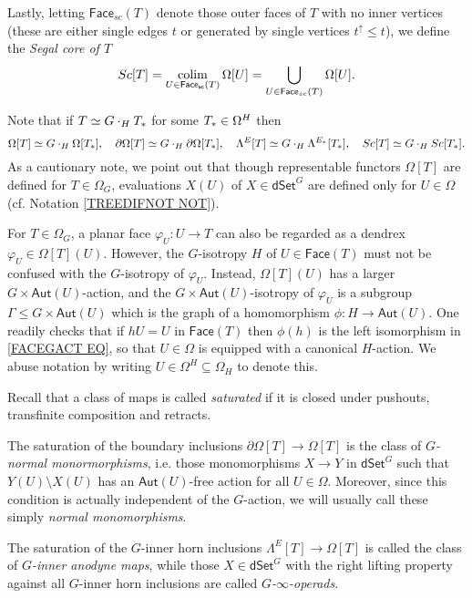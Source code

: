 \documentclass[a4paper,10pt,draft]{article}%
\begin{document}
Lastly, letting $\mathsf{Face}_{sc}(T)$ denote those outer faces of $T$ with no inner vertices (these are either single edges $t$ or generated by single vertices $t^{\uparrow} \leq t$), we define the 
\textit{Segal core of $T$}
\[
	Sc[T] 
= 
	\mathop{\operatorname{colim}}_{U \in 
	\mathsf{Face_{sc}}(T)}
	\Omega[U] 
=
	\bigcup_{U \in 
	\mathsf{Face}_{sc}(T)}
	\Omega[U].
\]

Note that if $T \simeq G \cdot_H T_{\**}$ for some $T_{\**} \in \Omega^H$ then 
\[
	\Omega[T] \simeq G \cdot_H \Omega[T_{\**}], 
\quad
	\partial \Omega[T] \simeq G \cdot_H \partial \Omega[T_{\**}], \quad
	\Lambda^{E}[T] \simeq G \cdot_H \Lambda^{E_{\**}}[T_{\**}],
\quad
	Sc[T] \simeq G \cdot_H Sc[T_{\**}].
\]
As a cautionary note, we point out that though representable functors $\Omega[T]$ are defined for $T \in \Omega_G$,
evaluations $X(U)$ of $X \in \mathsf{dSet}^G$
are defined only for $U \in \Omega$ (cf. Notation \ref{TREEDIFNOT NOT}).

\begin{remark}\label{FACEGACT REM}
	For $T \in \Omega_G$, a planar face $\varphi_U \colon U \to T$
	can also be regarded as a dendrex $\varphi_U \in \Omega[T](U)$.
	However, the $G$-isotropy $H$ of $U \in \mathsf{Face}(T)$ must not be confused with the $G$-isotropy of $\varphi_U$.
	Instead, $\Omega[T](U)$ has a larger $G \times \mathsf{Aut}(U)$-action,
	and the $G \times \mathsf{Aut}(U)$-isotropy of $\varphi_U$
	is a subgroup 
	$\Gamma \leq G \times \mathsf{Aut}(U)$
	which is the graph of a homomorphism
	$\phi\colon H \to \mathsf{Aut}(U)$.
	One readily checks that if $hU = U$ in $\mathsf{Face}(T)$ then
	$\phi(h)$ is the left isomorphism in \eqref{FACEGACT EQ},
	so that $U\in \Omega$ is equipped with a canonical $H$-action.
	We abuse notation by writing 
	$U \in \Omega^H \subseteq \Omega_H$ to denote this.  
\end{remark}

Recall that a class of maps is called \textit{saturated} if it is closed under pushouts, transfinite composition and retracts. 

The saturation of the boundary inclusions 
$\partial \Omega[T] \to \Omega[T]$
is the class of \textit{$G$-normal monormorphisms},
i.e. those monomorphisms $X \to Y$ in $\mathsf{dSet}^G$ such that
$Y(U) \setminus X(U)$ has an $\mathsf{Aut}(U)$-free action for all $U \in \Omega$. 
Moreover, since this condition is actually independent of the $G$-action, we will usually call these simply \textit{normal monomorphisms}.

The saturation of the $G$-inner horn inclusions 
$\Lambda^E[T] \to \Omega[T]$
is called the class of \textit{$G$-inner anodyne maps}, 
while those $X \in \mathsf{dSet}^G$
with the right lifting property against all $G$-inner horn inclusions are called \textit{$G$-$\infty$-operads}.
\end{document}
